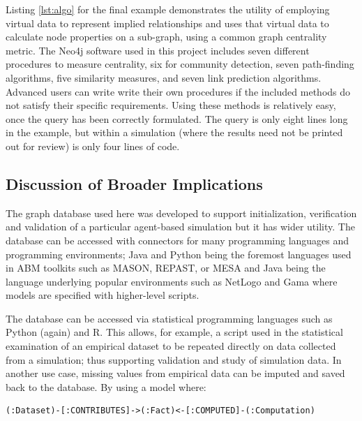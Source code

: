 \documentclass[runningheads]{llncs}
\begin{document}
Listing \ref{lst:algo} for the final example demonstrates the utility of employing virtual data to represent implied relationships and uses that virtual data to calculate node properties on a sub-graph, using a common graph centrality metric. 
The Neo4j software used in this project includes seven different procedures to measure centrality, six for community detection, seven path-finding algorithms, five similarity measures, and seven link prediction algorithms. 
Advanced users can write write their own procedures if the included methods do not satisfy their specific requirements.
Using these methods is relatively easy, once the query has been correctly formulated.
The query is only eight lines long in the example, but within a simulation (where the results need not be printed out for review) is only four lines of code.

\subsection{Discussion of Broader Implications}
The graph database used here was developed to support initialization, verification and validation of a particular agent-based simulation but it has wider utility. 
The database can be accessed with connectors for many programming languages and programming environments; Java and Python being the foremost languages used in ABM toolkits such as MASON, REPAST, or MESA and Java being the language underlying popular environments such as NetLogo and Gama where models are specified with higher-level scripts. 

The database can be accessed via statistical programming languages such as Python (again) and R.
This allows, for example, a script used in the statistical examination of an empirical dataset to be repeated directly on data collected from a simulation; thus supporting validation and study of simulation data.
In another use case, missing values from empirical data can be imputed and saved back to the database. 
By using a model where:

\begin{lstlisting}[caption={Managing provenance of computed values in a dataset.}, label={lst:compute}]
(:Dataset)-[:CONTRIBUTES]->(:Fact)<-[:COMPUTED]-(:Computation)
\end{lstlisting}
\end{document}
